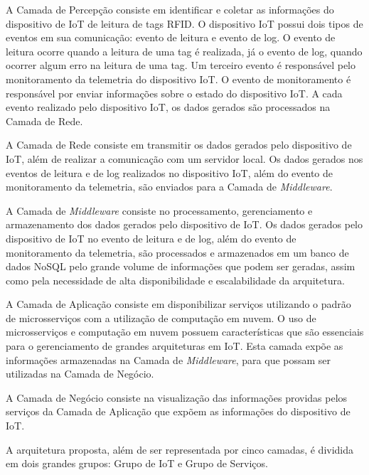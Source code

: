 
A Camada de Percepção consiste em identificar e coletar as informações do dispositivo de \acrshort{IoT} de leitura de tags \acrshort{RFID}. O dispositivo \acrshort{IoT} possui dois tipos de eventos em sua comunicação: evento de leitura e evento de log. O evento de leitura ocorre quando a leitura de uma tag é realizada, já o evento de log, quando ocorrer algum erro na leitura de uma tag. Um terceiro evento é responsável pelo monitoramento da telemetria do dispositivo \acrshort{IoT}. O evento de monitoramento é responsável por enviar informações sobre o estado do dispositivo \acrshort{IoT}. A cada evento realizado pelo dispositivo \acrshort{IoT}, os dados gerados são processados na Camada de Rede.

A Camada de Rede consiste em transmitir os dados gerados pelo dispositivo de \acrshort{IoT}, além de realizar a comunicação com um servidor local. Os dados gerados nos eventos de leitura e de log realizados no dispositivo \acrshort{IoT}, além do evento de monitoramento da telemetria, são enviados para a Camada de \textit{Middleware}.

A Camada de \textit{Middleware} consiste no processamento, gerenciamento e armazenamento dos dados gerados pelo dispositivo de \acrshort{IoT}. Os dados gerados pelo dispositivo de \acrshort{IoT} no evento de leitura e de log, além do evento de monitoramento da telemetria, são processados e armazenados em um banco de dados \acrfull{NoSQL} pelo grande volume de informações que podem ser geradas, assim como pela necessidade de alta disponibilidade e escalabilidade da arquitetura.

A Camada de Aplicação consiste em disponibilizar serviços utilizando o padrão de microsserviços com a utilização de computação em nuvem. O uso de microsserviços e computação em nuvem possuem características que são essenciais para o gerenciamento de grandes arquiteturas em \acrlong{IoT}. Esta camada expõe as informações armazenadas na Camada de \textit{Middleware}, para que possam ser utilizadas na Camada de Negócio.

A Camada de Negócio consiste na visualização das informações providas pelos serviços da Camada de Aplicação que expõem as informações do dispositivo de \acrshort{IoT}.

A arquitetura proposta, além de ser representada por cinco camadas, é dividida em dois grandes grupos: Grupo de \acrlong{IoT} e Grupo de Serviços.

